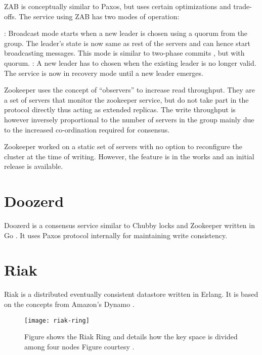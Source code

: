 ZAB is conceptually similar to Paxos, but uses certain optimizations and 
trade-offs. The service using ZAB has two modes of operation:

\begin{itemize}
    : Broadcast mode starts when a new leader is chosen
    using a quorum from the group. The leader's state is now same as rest of
    the servers and can hence start broadcasting messages.
    This mode is similar to two-phase commits \citep{Gray78}, but with quorum.
    : A new leader has to chosen when the existing leader 
    is no longer valid. The service is now in recovery mode until a new leader
    emerges.
\end{itemize}

Zookeeper uses the concept of ``observers'' to increase read throughput. They 
are a set of servers that monitor the zookeeper service, but do not take part
in the protocol directly thus acting as extended replicas. The write throughput
is however inversely proportional to the number of servers in the group mainly
due to the increased co-ordination required for consensus.

Zookeeper worked on a static set of servers with no option to reconfigure the
cluster at the time of writing. However, the feature is in the works 
\citep{zab2012}and an initial release is available.

\section{Doozerd}

Doozerd \citep{doozerd} is a consensus service similar to Chubby locks
 and Zookeeper  written in 
Go \citep{golang}. It uses Paxos protocol internally for maintaining
write consistency.


\section{Riak}

Riak \citep{riak} is a distributed eventually consistent datastore written in 
Erlang. It is based on the concepts from Amazon's Dynamo \citep{DeCandia07}.

\begin{figure}
  \texttt{[image: riak-ring]}
  \caption[Riak Ring]{%
    Figure shows the Riak Ring and details how the key space is divided among 
    four nodes
    Figure courtesy \citet{riak}.}
  \label{figure:megastore}
\end{figure}

